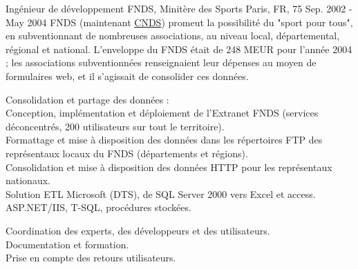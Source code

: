 \begin{cventries}
  \cventry
    {Ingénieur de développement} %
    {FNDS, Minitère des Sports} %
    {Paris, FR, 75} %
    {Sep. 2002 - May 2004} %
    {FNDS (maintenant \href{http://www.cnds.sports.gouv.fr}{CNDS}) promeut la possibilité du "sport pour tous", en subventionnant de nombreuses associations, au niveau local, départemental, régional et national. L'enveloppe du FNDS était de 248 MEUR pour l'année 2004 ; les associations subventionnées renseignaient leur dépenses au moyen de formulaires web, et il s'agissait de consolider ces données.} %
{
      \begin{cvitems} %
        \item {Consolidation et partage des données :\\Conception, implémentation et déploiement de l'Extranet FNDS (services déconcentrés, 200 utilisateurs sur tout le territoire).\\Formattage et mise à disposition des données dans les répertoires FTP des représentaux locaux du FNDS (départements et régions).\\Consolidation et mise à disposition des données HTTP pour les représentaux nationaux.\\Solution ETL Microsoft (DTS), de SQL Server 2000 vers Excel et access.\\ASP.NET/IIS, T-SQL, procédures stockées.}
        \item {Coordination des experts, des développeurs et des utilisateurs.\\Documentation et formation.\\Prise en compte des retours utilisateurs.}
      \end{cvitems}
} %


\end{cventries}
